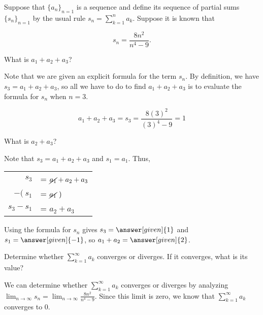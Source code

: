 \documentclass{ximera}
\begin{document}
\begin{example}
Suppose that $\{a_n\}_{n=1}$ is a sequence and define its sequence of partial sums $\{s_n\}_{n=1}$ by the usual rule $s_n = \sum_{k=1}^n a_k$.  Suppose it is known that

\[
s_n = \frac{8n^2}{n^4-9}.
\]

\begin{question}
What is $a_1+a_2+a_3$?  

\begin{explanation}
Note that we are given an explicit formula for the term $s_n$.  By definition, we have $s_3 = a_1+a_2+a_3$, so all we have to do to find $a_1+a_2+a_3$ is to evaluate the formula for $s_n$ when $n=3$.

\[
a_1+a_2+a_3 = s_3 = \frac{8(3)^2}{(3)^4-9} = 1
\]

\end{explanation}
\end{question}

\begin{question}
What is $a_2+a_3$?

\begin{explanation}
Note that $s_3 = a_1+a_2+a_3$ and $s_1 = a_1$.  Thus, 

\begin{tabular}{rl}
$s_3$ &= $\cancel{a_1}+a_2+a_3$\\
$-(~ s_1$ &= $\cancel{a_1} ~)$\\
\hline
$s_3-s_1$ &= $a_2+a_3$\\
\end{tabular}

Using the formula for $s_n$ gives $s_3 = \answer[given]{1}$ and $s_1=\answer[given]{-1}$, so $a_1+a_2 =  \answer[given]{2}$.
\end{explanation}
\end{question}

\begin{question}
Determine whether $\sum_{k=1}^{\infty} a_k$ converges or diverges.  If it converges, what is its value?

\begin{explanation}
We can determine whether $\sum_{k=1}^{\infty} a_k$ converges or diverges by analyzing $\lim_{n \to \infty} s_n = \lim_{n \to \infty} \frac{8n^2}{n^4-9}$.  Since this limit is zero, we know that $\sum_{k=1}^{\infty} a_k$ converges to $0$.
\end{explanation}
\end{question}


\end{example}
\end{document}
